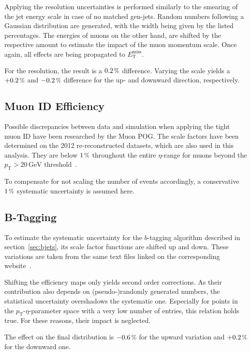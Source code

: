 Applying the resolution uncertainties is performed similarly to the smearing of the jet energy scale in case of no matched gen-jets. Random numbers following a Gaussian distribution are generated, with the width being given by the listed percentages. The energies of muons on the other hand, are shifted by the respective amount to estimate the impact of the muon momentum scale. Once again, all effects are being propagated to $E_{\text{T}}^{\text{miss}}$.

For the resolution, the result is a $0.2\,\pct$ difference. Varying the scale yields a $+0.2\,\pct$ and $-0.2\,\pct$ difference for the up- and downward direction, respectively.


\subsection{Muon  ID Efficiency}
\label{sec:muonidsys}

Possible discrepancies between data and simulation when applying the tight muon ID have been researched by the Muon POG. The scale factors have been determined on the 2012 re-reconstructed datasets, which are also used in this analysis. They are below $1\,\pct$ throughout the entire $\eta$-range for muons beyond the $p_{\text{T}} > 20\,\text{GeV}$ threshold~\cite{muonideff}. 

To compensate for not scaling the number of events accordingly, a conservative $1\,\pct$ systematic uncertainty is assumed here.


\subsection{B-Tagging}
\label{sec:btagsys}

To estimate the systematic uncertainty for the $b$-tagging algorithm described in section~\ref{sec:bjets}, its scale factor functions are shifted up and down. These variations are taken from the same text files linked on the corresponding website~\cite{btagtwiki}.

Shifting the efficiency maps only yields second order corrections. As their contribution also depends on (pseudo-)randomly generated numbers, the statistical uncertainty overshadows the systematic one. Especially for points in the $p_{\text{T}}$-$\eta$-parameter space with a very low number of entries, this relation holds true. For these reasons, their impact is neglected.

The effect on the final distribution is $-0.6\,\pct$ for the upward variation and $+0.2\,\pct$ for the downward one.



